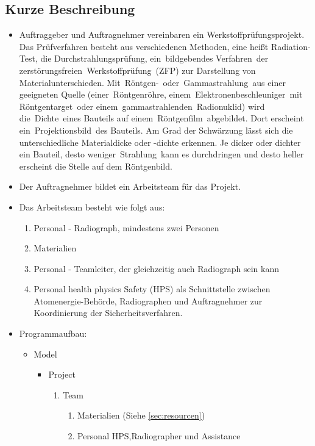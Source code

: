 \subsection{Kurze Beschreibung}
\begin{itemize}
\item Auftraggeber und Auftragnehmer vereinbaren ein Werkstoffprüfungsprojekt.
Das Prüfverfahren besteht aus verschiedenen Methoden, eine heißt Radiation-Test,
die Durchstrahlungsprüfung, ein bildgebendes Verfahren der
zerstörungsfreien Werkstoffprüfung (ZFP) zur Darstellung von Materialunterschieden.
Mit Röntgen- oder Gammastrahlung aus einer geeigneten Quelle (einer Röntgenröhre,
einem Elektronenbeschleuniger mit Röntgentarget oder
einem gammastrahlenden Radionuklid) wird die Dichte eines Bauteils auf
einem Röntgenfilm abgebildet.
Dort erscheint ein Projektionsbild des Bauteils. Am Grad der Schwärzung lässt sich die
unterschiedliche Materialdicke oder -dichte erkennen. Je dicker oder dichter ein Bauteil,
desto weniger Strahlung kann es durchdringen und desto heller erscheint die Stelle auf dem
Röntgenbild.
\item Der Auftragnehmer bildet ein Arbeitsteam für das Projekt.
\item Das Arbeitsteam besteht wie folgt aus:
\begin{enumerate}
\item Personal - Radiograph, mindestens zwei Personen
\item Materialien
\item Personal - Teamleiter, der gleichzeitig auch Radiograph sein kann
\item Personal health physics Safety (HPS) als Schnittstelle zwischen \\Atomenergie-Behörde, Radiographen und Auftragnehmer zur Koordinierung der Sicherheitsverfahren.
\end{enumerate}
\item Programmaufbau:
\begin{itemize}
\item Model
\begin{itemize}
\item Project
\begin{enumerate}
\item Team
\begin{enumerate}
\item Materialien (Siehe \ref{sec:resourcen})
\item Personal HPS,Radiographer und Assistance
\begin{enumerate}

\end{enumerate}
\end{enumerate}
\end{enumerate}
\end{itemize}
\end{itemize}
\end{itemize}

